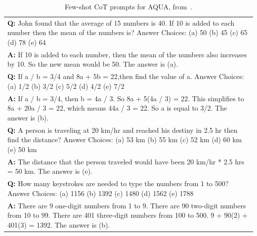 \begin{table}[h]
    \caption{
    Few-shot CoT prompts for AQUA, from~\cite{Wang2022SelfConsistencyIC}.
    }
    \centering
    \small
    \begin{tabular}{p{13.5cm}}
        \toprule
        \textbf{Q:} John found that the average of 15 numbers is 40. If 10 is added to each number then the mean of the numbers is? Answer Choices: (a) 50 (b) 45 (c) 65 (d) 78 (e) 64\\
        \vspace{-1mm}
        \textbf{A:} If 10 is added to each number, then the mean of the numbers also increases by 10. So the new mean would be 50. The answer is (a). \\
        \vspace{0mm}
        \textbf{Q:} If a / b = 3/4 and 8a + 5b = 22,then find the value of a. Answer Choices: (a) 1/2 (b) 3/2 (c) 5/2 (d) 4/2 (e) 7/2\\
        \vspace{-1mm}
        \textbf{A:} If a / b = 3/4, then b = 4a / 3. So 8a + 5(4a / 3) = 22. This simplifies to 8a + 20a / 3 = 22, which means 44a / 3 = 22. So a is equal to 3/2. The answer is (b).\\
        \vspace{0mm}
        \textbf{Q:} A person is traveling at 20 km/hr and reached his destiny in 2.5 hr then find the distance? Answer Choices: (a) 53 km (b) 55 km (c) 52 km (d) 60 km (e) 50 km\\
        \vspace{-1mm}
        \textbf{A:} The distance that the person traveled would have been 20 km/hr * 2.5 hrs = 50 km. The answer is (e).\\
        \vspace{0mm}
        \textbf{Q:} How many keystrokes are needed to type the numbers from 1 to 500? Answer Choices: (a) 1156 (b) 1392 (c) 1480 (d) 1562 (e) 1788\\
        \vspace{-1mm}
        \textbf{A:} There are 9 one-digit numbers from 1 to 9. There are 90 two-digit numbers from 10 to 99. There are 401 three-digit numbers from 100 to 500. 9 + 90(2) + 401(3) = 1392. The answer is (b).\\
        \bottomrule
    \end{tabular}
    \label{tab:prompt-aqua}
\end{table}


